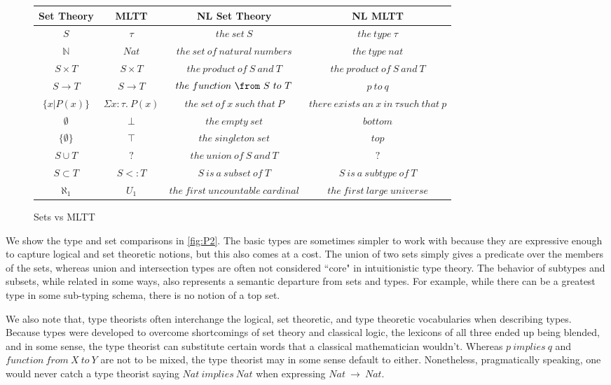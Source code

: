 \begin{figure}[H]
\centering
\begin{tabular}{|c|c|c|c|} \hline
 Set Theory & MLTT & NL Set Theory & NL MLTT \\ \hline
 $S$          & $\tau$                 & $the\ set\ S$                     & $the\ type\ \tau$ \\ 
 $\mathbb{N}$ & $Nat$                  & $the\ set\ of\ natural\ numbers$  & $the\ type\ nat$ \\
 $S \times T$ & $S \times T$           & $the\ product\ of\ S\ and\ T$     & $the\  product\  of\  S\  and\  T$ \\
 $S \to T$    & $S \to T$              & $the\ function\ \from\ S\ to\ T$  & $p\  to\  q$ \\
 $\{x|P(x)\}$ & $\Sigma x : \tau.\ P(x)$ & $the\ set\ of\ x\ such\ that\ P$  & $there\ exists\ an\ x\ in\ \tau such\ that\ p$ \\
  $\emptyset$  & $\bot$                 & $the\ empty\ set$                 & $bottom$ \\
 $\{\emptyset\}$          & $\top$     & $the\ singleton\ set$ & $top$ \\
 $S \cup T$   & $?$                    & $the\ union\ of\ S\ and\ T$       & $?$ \\
 $S \subset T$ & $S <: T$              & $S\ is\ a\ subset\ of\ T$          & $S\ is\ a\ subtype\ of\ T$ \\
 $\aleph_1$          & $U_1$           & $the\ first\ uncountable\ cardinal$ & $the\ first\ large\ universe$        \\ \hline 
\end{tabular}
\caption{Sets vs MLTT} \label{fig:P2}
\end{figure}

We show the type and set comparisons in \autoref{fig:P2}. The basic types are
sometimes simpler to work with because they are expressive enough to capture
logical and set theoretic notions, but this also comes at a cost. The union of
two sets simply gives a predicate over the members of the sets, whereas union
and intersection types are often not considered ``core" in intuitionistic type
theory. The behavior of subtypes and subsets, while related in some ways, also
represents a semantic departure from sets and types. For example, while there
can be a greatest type in some sub-typing schema, there is no notion of a top
set.

We also note that, type theorists often interchange the logical,
set theoretic, and type theoretic vocabularies when describing types. Because 
types were developed to overcome shortcomings of set theory and classical logic,
the lexicons of all three ended up being blended, and in some sense, the type
theorist can substitute certain words that a classical mathematician
wouldn't.  Whereas $p\ implies\ q$ and $function\ from\ X\ to\ Y$ are not to
be mixed, the type theorist may in some sense default to either.
Nonetheless, pragmatically speaking, one would never catch a type theorist
saying $Nat\ implies\ Nat$ when expressing $Nat\ \to\ Nat$.

